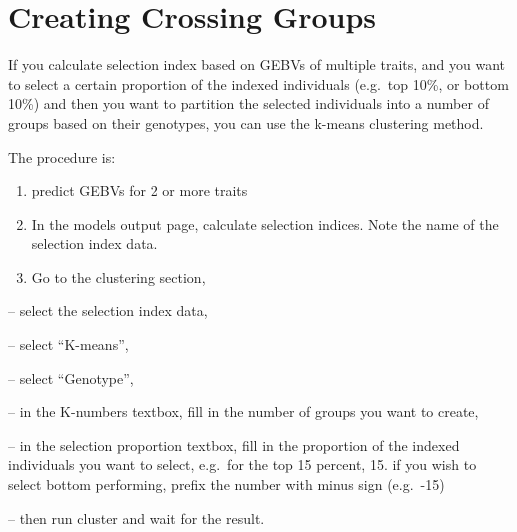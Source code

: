 \documentclass[
  12pt,
]{book}
\begin{document}
\hypertarget{creating-crossing-groups}{%
\section{Creating Crossing Groups}\label{creating-crossing-groups}}

If you calculate selection index based on GEBVs of multiple traits, and you want to select a certain proportion of the indexed individuals (e.g.~top 10\%, or bottom 10\%) and then you want to partition the selected individuals into a number of groups based on their genotypes, you can use the k-means clustering method.

The procedure is:

\begin{enumerate}
\def\labelenumi{(\arabic{enumi})}
\item
  predict GEBVs for 2 or more traits
\item
  In the models output page, calculate selection indices. Note the name of the selection index data.
\item
  Go to the clustering section,
\end{enumerate}

-- select the selection index data,

-- select ``K-means'',

-- select ``Genotype'',

-- in the K-numbers textbox, fill in the number of groups you want to create,

-- in the selection proportion textbox, fill in the proportion of the indexed individuals you want to select, e.g.~for the top 15 percent, 15. if you wish to select bottom performing, prefix the number with minus sign (e.g.~-15)

-- then run cluster and wait for the result.
\end{document}

